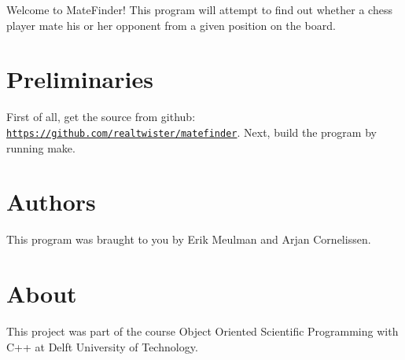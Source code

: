 Welcome to Mate\+Finder! This program will attempt to find out whether a chess player mate his or her opponent from a given position on the board.\hypertarget{index_Preliminaries}{}\section{Preliminaries}\label{index_Preliminaries}
First of all, get the source from github\+: \href{https://github.com/realtwister/matefinder}{\tt https\+://github.\+com/realtwister/matefinder}. Next, build the program by running make.\hypertarget{index_Authors}{}\section{Authors}\label{index_Authors}
This program was braught to you by Erik Meulman and Arjan Cornelissen.\hypertarget{index_About}{}\section{About}\label{index_About}
This project was part of the course Object Oriented Scientific Programming with C++ at Delft University of Technology. 